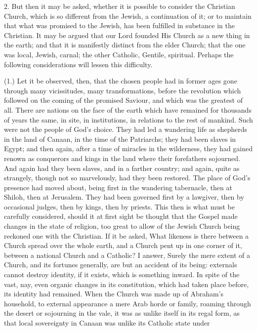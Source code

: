 2. But then it may be asked, whether it is possible to consider the
Christian Church, which is so different from the Jewish, a
continuation of it; or to maintain that what was promised to the
Jewish, has been fulfilled in substance in the Christian. It may be
argued that our Lord founded His Church as a new thing in the earth;
and that it is manifestly distinct from the elder Church; that the one
was local, Jewish, carnal; the other Catholic, Gentile, spiritual.
Perhaps the following considerations will lessen this difficulty.

(1.) Let it be observed, then, that the chosen people had in former
ages gone through many vicissitudes, many transformations, before the
revolution which followed on the coming of the promised Saviour, and
which was the greatest of all. There are nations on the face of the
earth which have remained for thousands of years the same, in site, in
institutions, in relations to the rest of mankind. Such were not the
people of God's choice. They had led a wandering life as shepherds in
the land of Canaan, in the time of the Patriarchs; they had been
slaves in Egypt; and then again, after a time of miracles in the
wilderness, they had gained renown as conquerors and kings in the land
where their forefathers sojourned. And again had they been slaves, and
in a farther country; and again, quite as strangely, though not so marvelously,
had they been restored. The place of God's presence had moved about,
being first in the wandering tabernacle, then at Shiloh, then at
Jerusalem. They had been governed first by a lawgiver, then by
occasional judges, then by kings, then by priests. This then is what
must be carefully considered, should it at first sight be thought that
the Gospel made changes in the state of religion, too great to allow
of the Jewish Church being reckoned one with the Christian. If it be
asked, What likeness is there between a Church spread over the whole
earth, and a Church pent up in one corner of it, between a national
Church and a Catholic? I answer, Surely the mere extent of a Church,
and its fortunes generally, are but an accident of its being:
externals cannot destroy identity, if it exists, which is something
inward. In spite of the vast, nay, even organic changes in its
constitution, which had taken place before, its identity had remained.
When the Church was made up of Abraham's household, to external
appearance a mere Arab horde or family, roaming through the desert or
sojourning in the vale, it was as unlike itself in its regal form, as
that local sovereignty in Canaan was unlike its Catholic state under
